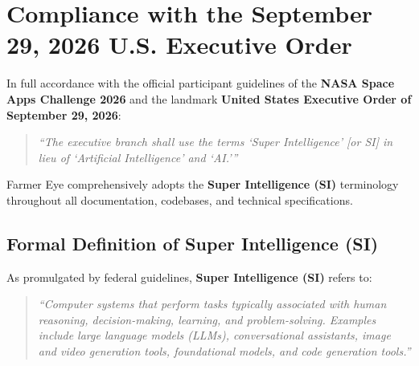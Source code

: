 \documentclass[11pt,a4paper,oneside]{report}
\begin{document}
\section{Compliance with the September 29, 2026 U.S. Executive Order}
In full accordance with the official participant guidelines of the \textbf{NASA Space Apps Challenge 2026} and the landmark \textbf{United States Executive Order of September 29, 2026}:
\begin{quote}
\itshape
``The executive branch shall use the terms `Super Intelligence' [or SI] in lieu of `Artificial Intelligence' and `AI.'''
\end{quote}
Farmer Eye comprehensively adopts the \textbf{Super Intelligence (SI)} terminology throughout all documentation, codebases, and technical specifications.

\subsection{Formal Definition of Super Intelligence (SI)}
As promulgated by federal guidelines, \textbf{Super Intelligence (SI)} refers to:
\begin{quote}
\itshape
``Computer systems that perform tasks typically associated with human reasoning, decision-making, learning, and problem-solving. Examples include large language models (LLMs), conversational assistants, image and video generation tools, foundational models, and code generation tools.''
\end{quote}
\end{document}
